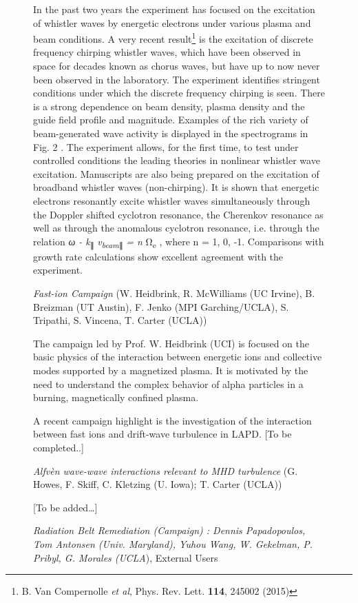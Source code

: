 \documentclass[11pt]{article}
\begin{document}
\begin{description}
\begin{figure}[!htbp]
In the past two years the experiment has focused on the excitation of
whistler waves by energetic electrons under various plasma and beam
conditions. A very recent result\footnote{B. Van Compernolle \emph{et
  al}, Phys. Rev. Lett. \textbf{114}, 245002 (2015)} is the excitation
of discrete frequency chirping whistler waves, which have been observed
in space for decades known as chorus waves, but have up to now never
been observed in the laboratory. The experiment identifies stringent
conditions under which the discrete frequency chirping is seen. There is
a strong dependence on beam density, plasma density and the guide field
profile and magnitude. Examples of the rich variety of beam-generated
wave activity is displayed in the spectrograms in Fig. 2 . The
experiment allows, for the first time, to test under controlled
conditions the leading theories in nonlinear whistler wave excitation.
Manuscripts are also being prepared on the excitation of broadband
whistler waves (non-chirping). It is shown that energetic electrons
resonantly excite whistler waves simultaneously through the Doppler
shifted cyclotron resonance, the Cherenkov resonance as well as through
the anomalous cyclotron resonance, i.e. through the relation \emph{ω -
k}\textsubscript{∥} \emph{v\textsubscript{beam}}\textsubscript{∥}
\emph{= n} Ω\textsubscript{e} , where n = 1, 0, -1. Comparisons with
growth rate calculations show excellent agreement with the experiment.

\emph{Fast-ion Campaign} (W. Heidbrink, R. McWilliams (UC Irvine), B.
Breizman (UT Austin), F. Jenko (MPI Garching/UCLA), S. Tripathi, S.
Vincena, T. Carter (UCLA))


The campaign led by Prof. W. Heidbrink (UCI) is focused on the basic
physics of the interaction between energetic ions and collective modes
supported by a magnetized plasma. It is motivated by the need to
understand the complex behavior of alpha particles in a burning,
magnetically confined plasma.

A recent campaign highlight is the investigation of the interaction
between fast ions and drift-wave turbulence in LAPD. {[}To be
completed..{]}


\emph{Alfvèn wave-wave interactions relevant to MHD turbulence} (G.
Howes, F. Skiff, C. Kletzing (U. Iowa); T. Carter (UCLA))

{[}To be added\ldots{}{]}

\emph{Radiation Belt Remediation (Campaign) : Dennis Papadopoulos, Tom
Antonsen (Univ. Maryland), Yuhou Wang, W. Gekelman, P. Pribyl, G.
Morales (UCLA}), External Users


\end{figure}
\end{description}
\end{document}
